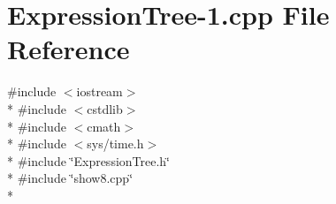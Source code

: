 \hypertarget{_expression_tree-1_8cpp}{\section{Expression\+Tree-\/1.cpp File Reference}
\label{_expression_tree-1_8cpp}
}
{\ttfamily \#include $<$iostream$>$}\\*
{\ttfamily \#include $<$cstdlib$>$}\\*
{\ttfamily \#include $<$cmath$>$}\\*
{\ttfamily \#include $<$sys/time.\+h$>$}\\*
{\ttfamily \#include \char`\"{}Expression\+Tree.\+h\char`\"{}}\\*
{\ttfamily \#include \char`\"{}show8.\+cpp\char`\"{}}\\*
